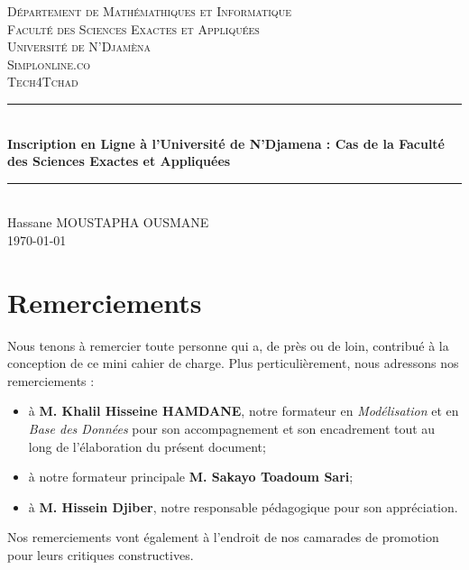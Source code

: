 \documentclass[12pt,a4paper]{article}
\begin{document}
	\begin{titlepage}
		\newcommand{\HRule}{\rule{\linewidth}{0.5mm}}
		\center
		\textsc{\large
			Département de Mathémathiques et Informatique \\
			Faculté des Sciences Exactes et Appliquées \\
			Université de N'Djamèna \\[0.5cm]
			Simplonline.co \\Tech4Tchad 
		} \\[1cm]
		\HRule \\[0.15cm]
		{ %
			\bfseries Inscription en Ligne à l'Université de N'Djamena : Cas de la Faculté des Sciences Exactes et Appliquées \\[0.15cm] }
		\HRule \\[1.5cm]
		Hassane MOUSTAPHA OUSMANE
		\\[1cm]
		\today \\ [1cm]
	\end{titlepage}

	\tableofcontents
	\thispagestyle{empty} 
	
	\newpage
	\section*{Remerciements}
	Nous tenons à remercier toute personne qui a, de près ou de loin, contribué à la conception de ce mini cahier de charge. Plus perticulièrement, nous adressons nos remerciements :
	\begin{itemize}
		\item à \textbf{M. Khalil Hisseine HAMDANE}, notre formateur en \emph{Modélisation} et en \emph{Base des Données} pour son accompagnement et son encadrement tout au long de l'élaboration du présent document;
		\item à notre formateur principale \textbf{M. Sakayo Toadoum Sari};
		\item à \textbf{M. Hissein Djiber}, notre responsable pédagogique pour son appréciation.
	\end{itemize}
	Nos remerciements vont également à l’endroit de nos camarades de promotion pour leurs critiques constructives.
	
\end{document}
